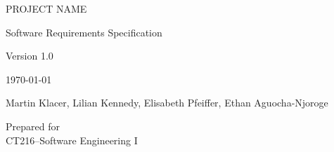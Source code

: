 \documentclass[12pt, a4paper]{article}
\newcommand{\projectname}{PROJECT NAME}
\begin{document}
\begin{titlepage}
    \centering
    \vspace*{4cm}
    {\Large \projectname \par}
    \vspace{2cm}
    {\Large Software Requirements Specification \par}
    \vspace{0.5cm}
    {\Large Version 1.0 \par}
    \vspace{0.5cm}
    {\Large \today \par}
    \vspace{2cm}
    {\Large Martin Klacer, Lilian Kennedy, Elisabeth Pfeiffer, Ethan Aguocha-Njoroge \par}
    \vfill

    Prepared for\\
    CT216--Software Engineering I\par

\end{titlepage}

\tableofcontents
\newpage







\end{document}
